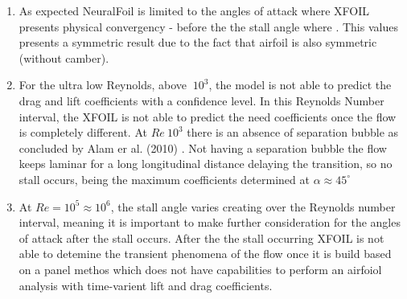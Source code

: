 \begin{enumerate}
    \item As expected NeuralFoil is limited to the angles of attack where XFOIL presents physical convergency - before the the stall angle where . This values presents a symmetric result due to the fact that airfoil is also symmetric (without camber).
    
    \item For the ultra low Reynolds, above $~ 10^3$, the model is not able to predict the drag and lift coefficients with a confidence level. In this Reynolds Number interval, the XFOIL is not able to predict the need coefficients once the flow is completely different. At $Re ~ 10^3$ there is an absence of separation bubble as  concluded by Alam er al. (2010) \cite{alam_ultra-low_2010}. Not having a separation bubble the flow keeps laminar for a long longitudinal distance delaying the transition, so no stall occurs, being the maximum coefficients determined at $\alpha \approx 45 ^{\circ}$
    
    \item At $Re = 10^5 \approx 10^6$, the stall angle varies creating over the Reynolds number interval, meaning it is important to make further consideration for the angles of attack after the stall occurs. After the the stall occurring XFOIL is not able to detemine the transient phenomena of the flow once it is build based on a panel methos which does not have capabilities to perform an airfoiol analysis with time-varient lift and drag coefficients.

\end{enumerate}

